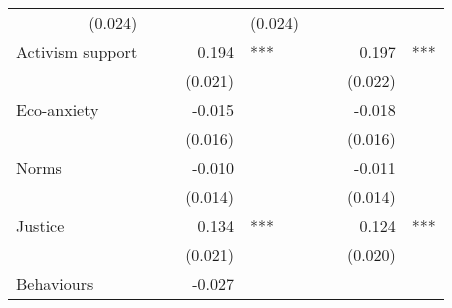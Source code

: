 \documentclass{article}
\begin{document}
\begin{table}[!h]
\begin{tabular}{lllllllll}
  \multicolumn{1}{r}{(0.024)} &
  \multicolumn{1}{l}{} &
  \multicolumn{1}{r}{} &
  \multicolumn{1}{l}{} &
  \multicolumn{1}{r}{(0.024)} &
  \multicolumn{1}{l}{} \\
\multicolumn{1}{l}{Activism support} &
  \multicolumn{1}{r}{} &
  \multicolumn{1}{l}{} &
  \multicolumn{1}{r}{0.194} &
  \multicolumn{1}{l}{***} &
  \multicolumn{1}{r}{} &
  \multicolumn{1}{l}{} &
  \multicolumn{1}{r}{0.197} &
  \multicolumn{1}{l}{***} \\
\multicolumn{1}{l}{} &
  \multicolumn{1}{r}{} &
  \multicolumn{1}{l}{} &
  \multicolumn{1}{r}{(0.021)} &
  \multicolumn{1}{l}{} &
  \multicolumn{1}{r}{} &
  \multicolumn{1}{l}{} &
  \multicolumn{1}{r}{(0.022)} &
  \multicolumn{1}{l}{} \\
\multicolumn{1}{l}{Eco-anxiety} &
  \multicolumn{1}{r}{} &
  \multicolumn{1}{l}{} &
  \multicolumn{1}{r}{-0.015} &
  \multicolumn{1}{l}{} &
  \multicolumn{1}{r}{} &
  \multicolumn{1}{l}{} &
  \multicolumn{1}{r}{-0.018} &
  \multicolumn{1}{l}{} \\
\multicolumn{1}{l}{} &
  \multicolumn{1}{r}{} &
  \multicolumn{1}{l}{} &
  \multicolumn{1}{r}{(0.016)} &
  \multicolumn{1}{l}{} &
  \multicolumn{1}{r}{} &
  \multicolumn{1}{l}{} &
  \multicolumn{1}{r}{(0.016)} &
  \multicolumn{1}{l}{} \\
\multicolumn{1}{l}{Norms} &
  \multicolumn{1}{r}{} &
  \multicolumn{1}{l}{} &
  \multicolumn{1}{r}{-0.010} &
  \multicolumn{1}{l}{} &
  \multicolumn{1}{r}{} &
  \multicolumn{1}{l}{} &
  \multicolumn{1}{r}{-0.011} &
  \multicolumn{1}{l}{} \\
\multicolumn{1}{l}{} &
  \multicolumn{1}{r}{} &
  \multicolumn{1}{l}{} &
  \multicolumn{1}{r}{(0.014)} &
  \multicolumn{1}{l}{} &
  \multicolumn{1}{r}{} &
  \multicolumn{1}{l}{} &
  \multicolumn{1}{r}{(0.014)} &
  \multicolumn{1}{l}{} \\
\multicolumn{1}{l}{Justice} &
  \multicolumn{1}{r}{} &
  \multicolumn{1}{l}{} &
  \multicolumn{1}{r}{0.134} &
  \multicolumn{1}{l}{***} &
  \multicolumn{1}{r}{} &
  \multicolumn{1}{l}{} &
  \multicolumn{1}{r}{0.124} &
  \multicolumn{1}{l}{***} \\
\multicolumn{1}{l}{} &
  \multicolumn{1}{r}{} &
  \multicolumn{1}{l}{} &
  \multicolumn{1}{r}{(0.021)} &
  \multicolumn{1}{l}{} &
  \multicolumn{1}{r}{} &
  \multicolumn{1}{l}{} &
  \multicolumn{1}{r}{(0.020)} &
  \multicolumn{1}{l}{} \\
\multicolumn{1}{l}{Behaviours} &
  \multicolumn{1}{r}{} &
  \multicolumn{1}{l}{} &
  \multicolumn{1}{r}{-0.027} &
  \multicolumn{1}{l}{} &

\end{tabular}
\end{table}
\end{document}
